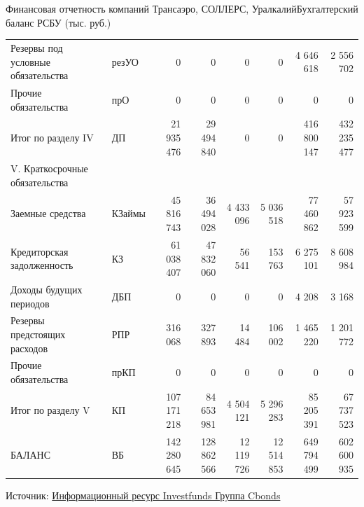 \documentclass[_Banking_p2.tex]{subfiles}
\begin{document}
\begin{frame}[shrink=70]{Финансовая отчетность компаний Трансаэро, СОЛЛЕРС, Уралкалий}{Бухгалтерский баланс РСБУ (тыс. руб.)}
\begin{table}[htbp]
\begin{tabular}{L{8cm} lrrrrrr}
Резервы под условные обязательства & резУО & 0     & 0     & 0     & 0     & 4 646 618 & 2 556 702 \\
Прочие обязательства & прО   & 0     & 0     & 0     & 0     & 0     & 0 \\
Итог по разделу IV & ДП    & 21 935 476 & 29 494 840 & 0     & 0     & 416 800 147 & 432 235 477 \\
V. Краткосрочные обязательства &       & \textbf{} & \textbf{} & \textbf{} & \textbf{} & \textbf{} & \textbf{} \\
Заемные средства & КЗаймы & 45 816 743 & 36 494 028 & 4 433 096 & 5 036 518 & 77 460 862 & 57 923 599 \\
Кредиторская задолженность & КЗ    & 61 038 407 & 47 832 060 & 56 541 & 153 763 & 6 275 101 & 8 608 984 \\
Доходы будущих периодов & ДБП   & 0     & 0     & 0     & 0     & 4 208 & 3 168 \\
Резервы предстоящих расходов & РПР   & 316 068 & 327 893 & 14 484 & 106 002 & 1 465 220 & 1 201 772 \\
Прочие обязательства & прКП  & 0     & 0     & 0     & 0     & 0     & 0 \\
Итог по разделу V & КП    & 107 171 218 & 84 653 981 & 4 504 121 & 5 296 283 & 85 205 391 & 67 737 523 \\
БАЛАНС & ВБ    & 142 280 645 & 128 862 566 & 12 119 726 & 12 514 853 & 649 794 499 & 602 600 935 \\
\bottomrule
\end{tabular}%
\label{tab:addlabel}%
\end{table}%
Источник: \href{http://investfunds.ru/}{Информационный ресурс Investfunds Группа Cbonds}

\end{frame}
\end{document}
